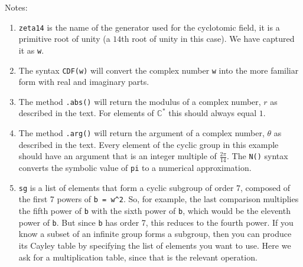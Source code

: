 %
Notes:
\begin{enumerate}
%
\item \verb?zeta14? is the name of the generator used for the cyclotomic field, it is a primitive root of unity (a $14$th root of unity in this case).  We have captured it as \verb?w?.
%
\item The syntax \verb?CDF(w)? will convert the complex number \verb?w? into the more familiar form with real and imaginary parts.
%
\item The method \verb?.abs()? will return the modulus of a complex number, $r$ as described in the text.  For elements of ${\mathbb C}^\ast$ this should always equal $1$.
%
\item The method \verb?.arg()? will return the argument of a complex number, $\theta$ as described in the text.  Every element of the cyclic group in this example should have an argument that is an integer multiple of $\frac{2\pi}{14}$.  The \verb?N()? syntax converts the symbolic value of \verb?pi? to a numerical approximation.
%
\item \verb?sg? is a list of elements that form a cyclic subgroup of order 7, composed of the first 7 powers of \verb?b = w^2?.  So, for example, the last comparison multiplies the fifth power of \verb?b? with the sixth power of \verb?b?, which would be the eleventh power of \verb?b?.  But since \verb?b? has order 7, this reduces to the fourth power.
%
If you know a subset of an infinite group forms a subgroup, then you can produce its Cayley table by specifying the list of elements you want to use.  Here we ask for a multiplication table, since that is the relevant operation.
%
\end{enumerate}
%
